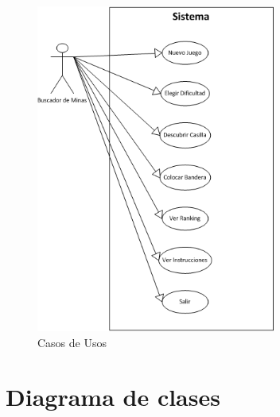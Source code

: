 \documentclass[11pt]{article} %
\begin{document}
\begin{center}

	\begin{figure}[h!]
  		\centering
    		\includegraphics[width=0.7\textwidth]{imagenes/casosdeusos.png}
  		\caption{Casos de Usos}
		\label{fig:casosdeusos}
	\end{figure}
\end{center}

\newpage
\thispagestyle{empty}

\section{Diagrama de clases }
\end{document}
